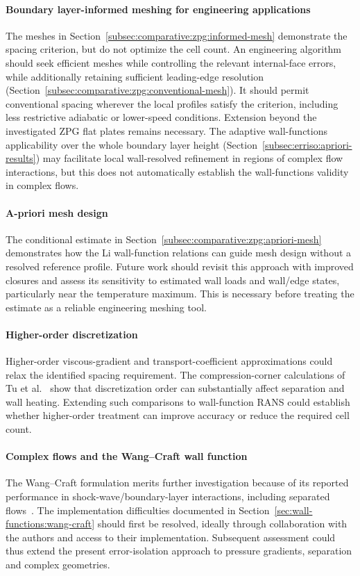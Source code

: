 \paragraph*{Boundary layer-informed meshing for engineering applications}
The meshes in Section~\ref{subsec:comparative:zpg:informed-mesh} demonstrate the spacing criterion, but do not optimize the cell count. An engineering algorithm should seek efficient meshes while controlling the relevant internal-face errors, while additionally retaining sufficient leading-edge resolution (Section~\ref{subsec:comparative:zpg:conventional-mesh}). It should permit conventional spacing wherever the local profiles satisfy the criterion, including less restrictive adiabatic or lower-speed conditions. Extension beyond the investigated ZPG flat plates remains necessary. The adaptive wall-functions applicability over the whole boundary layer height (Section~\ref{subsec:erriso:apriori-results}) may facilitate local wall-resolved refinement in regions of complex flow interactions, but this does not automatically establish the wall-functions validity in complex flows.

\paragraph*{A-priori mesh design}
The conditional estimate in Section~\ref{subsec:comparative:zpg:apriori-mesh} demonstrates how the Li wall-function relations can guide mesh design without a resolved reference profile. Future work should revisit this approach with improved closures and assess its sensitivity to estimated wall loads and wall/edge states, particularly near the temperature maximum. This is necessary before treating the estimate as a reliable engineering meshing tool.

\paragraph*{Higher-order discretization}
Higher-order viscous-gradient and transport-coefficient approximations could relax the identified spacing requirement. The compression-corner calculations of Tu et al.~\cite{guohua2012assessment} show that discretization order can substantially affect separation and wall heating. Extending such comparisons to wall-function RANS could establish whether higher-order treatment can improve accuracy or reduce the required cell count.

\paragraph*{Complex flows and the Wang--Craft wall function}
The Wang--Craft formulation merits further investigation because of its reported performance in shock-wave/boundary-layer interactions, including separated flows~\cite{wang2023WF}. The implementation difficulties documented in Section~\ref{sec:wall-functions:wang-craft} should first be resolved, ideally through collaboration with the authors and access to their implementation. Subsequent assessment could thus extend the present error-isolation approach to pressure gradients, separation and complex geometries.